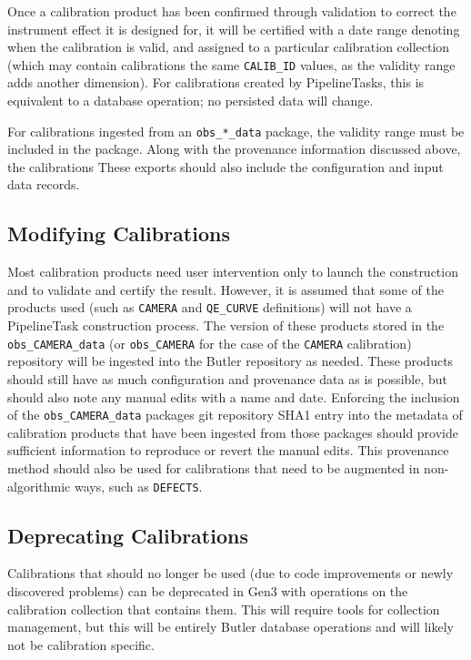 \documentclass[DM,authoryear,toc]{lsstdoc}
\begin{document}
Once a calibration product has been confirmed through validation to
correct the instrument effect it is designed for, it will be certified
with a date range denoting when the calibration is valid, and assigned
to a particular calibration collection (which may contain calibrations
the same \verb|CALIB_ID| values, as the validity range adds another
dimension).  For calibrations created by PipelineTasks, this is
equivalent to a database operation; no persisted data will change.

For calibrations ingested from an \verb|obs_*_data| package, the
validity range must be included in the package.  Along with the provenance information discussed above, the calibrations These exports should also include the configuration and
input data records.

\subsection{Modifying Calibrations}

Most calibration products need user intervention only to launch the
construction and to validate and certify the result.  However, it is
assumed that some of the products used (such as \verb|CAMERA| and
\verb|QE_CURVE| definitions) will not have a PipelineTask construction
process.  The version of these products stored in the
\verb|obs_CAMERA_data| (or \verb|obs_CAMERA| for the case of the
\verb|CAMERA| calibration) repository will be ingested into the Butler
repository as needed.  These products should still have as much
configuration and provenance data as is possible, but should also note
any manual edits with a name and date.  Enforcing the inclusion of the
\verb|obs_CAMERA_data| packages git repository SHA1 entry into the
metadata of calibration products that have been ingested from those
packages should provide sufficient information to reproduce or revert
the manual edits.  This provenance method should also be used for
calibrations that need to be augmented in non-algorithmic ways, such
as \verb|DEFECTS|.

\subsection{Deprecating Calibrations}

Calibrations that should no longer be used (due to code improvements
or newly discovered problems) can be deprecated in Gen3 with
operations on the calibration collection that contains them.  This
will require tools for collection management, but this will be
entirely Butler database operations and will likely not be calibration
specific.
\end{document}
